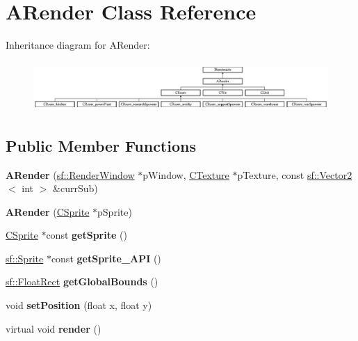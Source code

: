 \hypertarget{classARender}{\section{A\-Render Class Reference}
\label{classARender}
}
Inheritance diagram for A\-Render\-:\begin{figure}[H]
\begin{center}
\leavevmode
\includegraphics[height=1.904762cm]{classARender}
\end{center}
\end{figure}
\subsection*{Public Member Functions}
\begin{DoxyCompactItemize}
\item 
\hypertarget{classARender_aab5008f916fc294b62ee7834f458019f}{{\bfseries A\-Render} (\hyperlink{classsf_1_1RenderWindow}{sf\-::\-Render\-Window} $\ast$p\-Window, \hyperlink{classCTexture}{C\-Texture} $\ast$p\-Texture, const \hyperlink{classsf_1_1Vector2}{sf\-::\-Vector2}$<$ int $>$ \&curr\-Sub)}\label{classARender_aab5008f916fc294b62ee7834f458019f}

\item 
\hypertarget{classARender_a50d4f2bc7c47e6e7e428b8b118ed4dbf}{{\bfseries A\-Render} (\hyperlink{classCSprite}{C\-Sprite} $\ast$p\-Sprite)}\label{classARender_a50d4f2bc7c47e6e7e428b8b118ed4dbf}

\item 
\hypertarget{classARender_a8bfe4f2754b6182dffe0568b6a8c3c16}{\hyperlink{classCSprite}{C\-Sprite} $\ast$const {\bfseries get\-Sprite} ()}\label{classARender_a8bfe4f2754b6182dffe0568b6a8c3c16}

\item 
\hypertarget{classARender_a4a84fea3623aeda89055e0f4a9c747b1}{\hyperlink{classsf_1_1Sprite}{sf\-::\-Sprite} $\ast$const {\bfseries get\-Sprite\-\_\-\-A\-P\-I} ()}\label{classARender_a4a84fea3623aeda89055e0f4a9c747b1}

\item 
\hypertarget{classARender_a2f2dcc8cda41d6973eb83c15df294e7e}{\hyperlink{classsf_1_1Rect}{sf\-::\-Float\-Rect} {\bfseries get\-Global\-Bounds} ()}\label{classARender_a2f2dcc8cda41d6973eb83c15df294e7e}

\item 
\hypertarget{classARender_a987cef61b7f12a3697329983d3ff612d}{void {\bfseries set\-Position} (float x, float y)}\label{classARender_a987cef61b7f12a3697329983d3ff612d}

\item 
\hypertarget{classARender_a9cfade239daee0bd6b7b9023aac24e48}{virtual void {\bfseries render} ()}\label{classARender_a9cfade239daee0bd6b7b9023aac24e48}

\end{DoxyCompactItemize}
